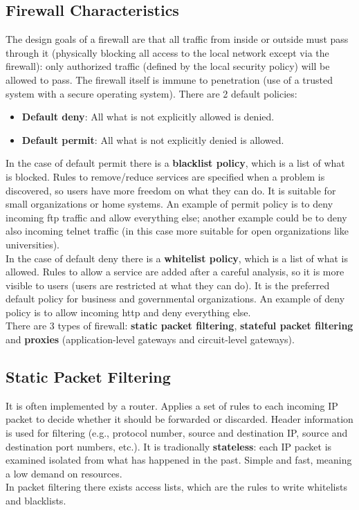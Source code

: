 \documentclass[a4paper, 10pt, titlepage]{article}
\begin{document}
\subsection*{Firewall Characteristics}
The design goals of a firewall are that all traffic from inside or outside must pass through it (physically blocking all access to the local network except via the firewall): only authorized traffic (defined by the local security policy) will be allowed to pass. The firewall itself is immune to penetration (use of a trusted system with a secure operating system). There are 2 default policies:
\begin{itemize}
	\item \textbf{Default deny}: All what is not explicitly allowed is denied.
	\item \textbf{Default permit}: All what is not explicitly denied is allowed.
\end{itemize}
In the case of default permit there is a \textbf{blacklist policy}, which is a list of what is blocked. Rules to remove/reduce services are specified when a problem is discovered, so users have more freedom on what they can do. It is suitable for small organizations or home systems. An example of permit policy is to deny incoming ftp traffic and allow everything else; another example could be to deny also incoming telnet traffic (in this case more suitable for open organizations like universities). \medskip\\
In the case of default deny there is a \textbf{whitelist policy}, which is a list of what is allowed. Rules to allow a service are added after a careful analysis, so it is more visible to users (users are restricted at what they can do). It is the preferred default policy for business and governmental organizations. An example of deny policy is to allow incoming http and deny everything else. \medskip\\
There are 3 types of firewall: \textbf{static packet filtering}, \textbf{stateful packet filtering} and \textbf{proxies} (application-level gateways and circuit-level gateways).

\subsection{Static Packet Filtering}
It is often implemented by a router. Applies a set of rules to each incoming IP packet to decide whether it should be forwarded or discarded. Header information is used for filtering (e.g., protocol number, source and destination IP, source and destination port numbers, etc.). It is tradionally \textbf{stateless}: each IP packet is examined isolated from what has happened in the past. Simple and fast, meaning a low demand on resources. \\
In packet filtering there exists access lists, which are the rules to write whitelists and blacklists.
\end{document}
